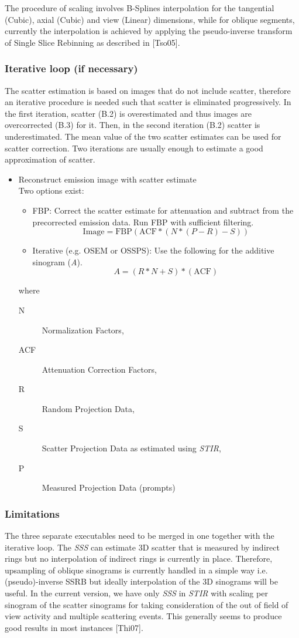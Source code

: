 \documentclass{article}
\begin{document}
{The procedure of scaling involves B-Splines interpolation for the tangential (Cubic), axial (Cubic) and
view (Linear) dimensions, while for oblique segments, currently the interpolation is achieved by applying the
pseudo-inverse transform of Single Slice Rebinning as described in [Tso05].

\subsubsection{Iterative loop (if necessary)}
The scatter estimation is based on images that do not include scatter, therefore an iterative procedure
is needed such that scatter is eliminated progressively. In the first iteration, scatter (B.2) is
overestimated and thus images are overcorrected (B.3) for it. Then, in the second iteration (B.2) scatter
is underestimated. The mean value of the two scatter estimates can be used for scatter correction. Two
iterations are usually enough to estimate a good approximation of scatter.

\begin{itemize}
\item Reconstruct emission image with scatter estimate\\
Two options exist:
\begin{itemize}
\item	FBP: Correct the scatter estimate for attenuation and subtract from the precorrected emission data. 
Run FBP with sufficient filtering.
   \[\mathrm{Image} = \mathrm{FBP}\left(\mathrm{ACF}*(N*(P-R)-S)\right) \]
\item Iterative (e.g. OSEM or OSSPS): Use the following for the additive sinogram (\textit{A}).
    \[A=(R*N+S)*(\mathrm{ACF})  \]
\end{itemize}
where
  \begin{description}
   \item[N] Normalization Factors, 
   \item[ACF] Attenuation Correction Factors,
   \item[R] Random Projection Data,
   \item[S] Scatter Projection Data as estimated using  \textit{STIR},
   \item[P] Measured Projection Data (prompts)
  \end{description}
\end{itemize}

\subsubsection{Limitations}
The three separate executables need to be merged in one together with the iterative loop. The
\textit{SSS} can estimate 3D scatter that is measured by indirect rings but no interpolation of indirect
rings is currently in place. Therefore, upsampling of oblique sinograms is currently handled in a simple
way i.e. (pseudo)-inverse SSRB but ideally interpolation of the 3D sinograms will be useful. In the
current version, we have only \textit{SSS} in \textit{STIR} with scaling per sinogram of the scatter
sinograms for taking consideration of the out of field of view activity and multiple scattering
events. This generally seems to produce good results in most instances [Thi07].


}
\end{document}
